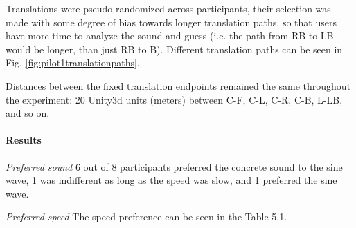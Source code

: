 Translations were pseudo-randomized across participants, their selection was made with some degree of bias towards longer translation paths, so that users have more time to analyze the sound and guess (i.e. the path from RB to LB would be longer, than just RB to B). Different translation paths can be seen in Fig. \ref{fig:pilot1translationpaths}.

Distances between the fixed translation endpoints remained the same throughout the experiment: 20 Unity3d units (meters) between C-F, C-L, C-R, C-B, L-LB, and so on.

\paragraph{Results} \hfill

\textit{Preferred sound} 6 out of 8 participants preferred the concrete sound to the sine wave, 1 was indifferent as long as the speed was slow, and 1 preferred the sine wave.

\textit{Preferred speed} The speed preference can be seen in the Table 5.1.

